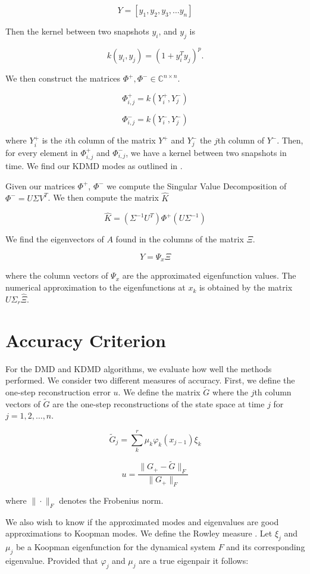 $$
 Y = [y_1,y_2,y_3, \dots y_n]
$$

\noindent Then the kernel between two snapshots $y_i$, and $y_j$ is

$$
k (y_i,y_j) = (1 + y^T_i y_j)^p.
$$

\noindent We then construct the matrices $\Phi^{+}, \Phi^{-} \in \mathbb{C}^{n \times n}$.

$$
\Phi^{+}_{i,j} = k(Y^{+}_{i}, Y^{-}_j)
$$

$$
\Phi^{-}_{i,j} = k(Y^{-}_{i}, Y^{-}_j)
$$

\noindent where $Y^{+}_{i}$ is the $i$th column of the matrix $Y^{+}$ and $Y^{-}_{j}$ the $j$th column of $Y^{-}$.
Then, for every element in $\Phi^{+}_{i,j}$ and $\Phi^{-}_{i,j}$, we have a kernel between two snapshots in time. We find
our KDMD modes as outlined in \cite{williams2015kernelbased}.

Given our matrices $\Phi^{+}$, $\Phi^{-}$ we compute the Singular Value Decomposition of $\Phi^{-} = U \Sigma V^T$. 
We then compute the matrix ${\hat K}$

$$
{\hat K} = (\Sigma^{-1} U^T) \Phi^{+} (U \Sigma^{-1} )
$$

\noindent We find the eigenvectors of $A$ found in the columns of the matrix $\Xi$.

$$
Y = \Psi_{x} \Xi
$$

\noindent where the
column vectors of ${\Psi_x}$ are the approximated eigenfunction values.
The numerical approximation to the eigenfunctions at $x_k$
 is obtained by the matrix $U \Sigma_r {\hat \Xi}$.

\section{Accuracy Criterion}
For the DMD and KDMD algorithms, we evaluate how
well the methods performed. We consider two different measures
of accuracy. First, we define the one-step reconstruction
error $u$. We define the matrix ${\tilde G}$ where the $j$th column vectors of ${\tilde G}$ are the one-step
reconstructions of the state space at time $j$ for $j=1,2,\dots, n$.

$$
{\tilde G}_{j} = \sum^{r}_{k} \mu_k \varphi_k(x_{j-1}) \xi_k
$$

$$
u = \frac{\|G_{+} - {\tilde G} \|_F}{\|G_{+}\|_F}
$$


\noindent where $\| \cdot \|_F$ denotes the Frobenius norm.

We also wish to know if the approximated modes and eigenvalues are good approximations to 
Koopman modes. We define the Rowley measure \cite{zhang2017evaluating}. Let $\xi_j$ and $\mu_j$ be a Koopman eigenfunction for the
 dynamical system $F$ and its corresponding eigenvalue. Provided that $\varphi_j$ and $\mu_j$ are
a true eigenpair it follows:

